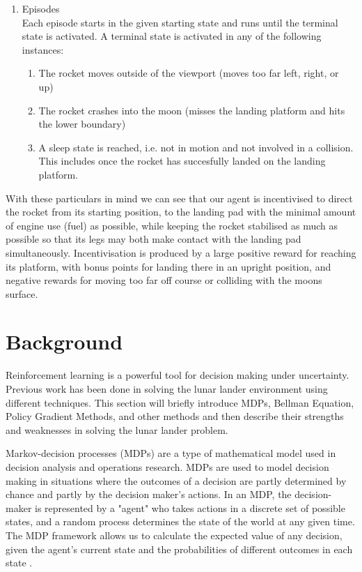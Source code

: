 \documentclass{article}
\begin{document}
\begin{enumerate}
  \item Episodes\\
  Each episode starts in the given starting state and runs until the terminal state is activated. A terminal state is activated in any of the following instances:
  \begin{enumerate}
    \item The rocket moves outside of the viewport (moves too far left, right, or up)
    \item The rocket crashes into the moon (misses the landing platform and hits the lower boundary)
    \item A sleep state is reached, i.e. not in motion and not involved in a collision. This includes once the rocket has succesfully landed on the landing platform.
  \end{enumerate}
\end{enumerate}

With these particulars in mind we can see that our agent is incentivised to direct the rocket from its starting position, to the landing pad with the minimal amount of engine use (fuel) as possible, while keeping the rocket stabilised as much as possible so that its legs may both make contact with the landing pad simultaneously. Incentivisation is produced by a large positive reward for reaching its platform, with bonus points for landing there in an upright position, and negative rewards for moving too far off course or colliding with the moons surface.


\section{Background}
Reinforcement learning is a powerful tool for decision making under uncertainty. Previous work has been done in solving the lunar lander environment using different techniques. This section will briefly introduce MDPs, Bellman Equation, Policy Gradient Methods, and other methods and then describe their strengths and weaknesses in solving the lunar lander problem.

Markov-decision processes (MDPs) are a type of mathematical model used in decision analysis and operations research. MDPs are used to model decision making in situations where the outcomes of a decision are partly determined by chance and partly by the decision maker's actions. In an MDP, the decision-maker is represented by a "agent" who takes actions in a discrete set of possible states, and a random process determines the state of the world at any given time. The MDP framework allows us to calculate the expected value of any decision, given the agent's current state and the probabilities of different outcomes in each state \citep{sutton1999between}.
\end{document}
